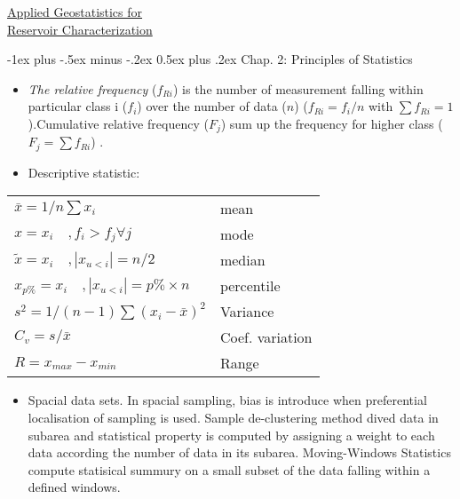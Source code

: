 \documentclass[10pt,landscape]{article}
\makeatletter
\renewcommand{\section}{\@startsection{section}{1}{0mm}%
                                {-1ex plus -.5ex minus -.2ex}%
                                {0.5ex plus .2ex}%
                                {\normalfont\large\bfseries}}
\makeatother
\begin{document}
\raggedright
\footnotesize
\begin{multicols}{3}


\setlength{\premulticols}{1pt}
\setlength{\postmulticols}{1pt}
\setlength{\multicolsep}{1pt}
\setlength{\columnsep}{2pt}



\begin{center}
     \Large{\underline{Applied Geostatistics for}} \\
     \Large{\underline{Reservoir Characterization}} \\
\end{center}

\section{Chap. 2: Principles of Statistics}
\begin{itemize}
\item \emph{The relative frequency} ($f_{Ri}$) is the number of measurement falling within particular class i ($f_{i}$)  over the number of data ($n$)  ($f_{Ri}=f_i/n$ with $\sum f_{Ri}=1$).Cumulative relative frequency ($F_{j}$)  sum up the frequency for higher class ($F_j=\sum f_{Ri}$) .\\
\item Descriptive statistic:\\
\end{itemize}
\begin{tabular}{@{}ll@{}}
$ \bar{x}=1/n \sum{x_i}$ & mean\\
$x=x_i \quad , f_{i}>f_{j} \forall j$  & mode\\
$\tilde{x}=x_i \quad , |x_{u<i}| = n/2$  & median\\
$x_{p\%}=x_i \quad , |x_{u<i}| = p\% \times n$  & percentile\\
$s^2=1/(n-1) \sum{(x_i-\bar{x})^2}$ & Variance\\
$C_v = s/\bar{x}$ & Coef. variation\\
$R=x_{max}-x_{min}$ & Range \\
\end{tabular}
\begin{itemize}
\item Spacial data sets.
In spacial sampling, bias is introduce when preferential localisation of sampling is used. Sample de-clustering method dived data in subarea and statistical property is computed by assigning a weight to each data according the number of data in its subarea. Moving-Windows Statistics compute statisical summury on a small subset of the data falling within a defined windows. 


\end{itemize}
\end{multicols}
\end{document}
